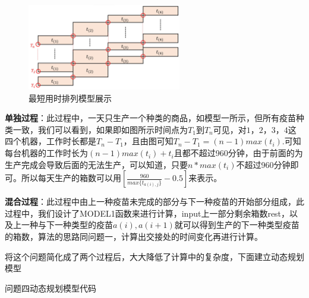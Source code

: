 \documentclass{ctexart}
\begin{document}
\begin{figure}%
\vspace{-1em}
  \begin{center}
    \includegraphics[width=0.6\textwidth]{A4图片/A4pre.JPG}
  \end{center}
  \label{min}
  \caption{最短用时排列模型展示}
\end{figure}
\textbf{单独过程}：此过程中，一天只生产一个种类的商品，如模型一所示，但所有疫苗种类一致，我们可以看到，如果即如图所示时间点为$T_1$到$T_n$可见，对$1，2，3，4$这四个机器，工作时长都是$T_n - T_1$，且由图可知$T_n - T_1 = (n-1)max(t_i)$.可知每台机器的工作时长为$(n-1)max(t_i)+t_i$且都不超过960分钟，由于前面的为生产完成会导致后面的无法生产，可以知道，只要$n*max(t_i)$不超过960分钟即可。所以每天生产的箱数可以用$[\frac{960}{max \{t_{a(i),j}\} }-0.5]$来表示。\par
\textbf{混合过程}：此过程中由上一种疫苗未完成的部分与下一种疫苗的开始部分组成，此过程中，我们设计了MODEL1函数来进行计算，input上一部分剩余箱数rest，以及上一种与下一种类型的疫苗$a(i),a(i+1)$就可以得到生产的下一种类型疫苗的箱数，算法的思路同问题一，计算出交接处的时间变化再进行计算。\par
将这个问题简化成了两个过程后，大大降低了计算中的复杂度，下面建立动态规划模型

\begin{algorithm}[H]
  \SetAlgoLined
  \caption{问题四动态规划模型代码}
\end{algorithm}
\end{document}
